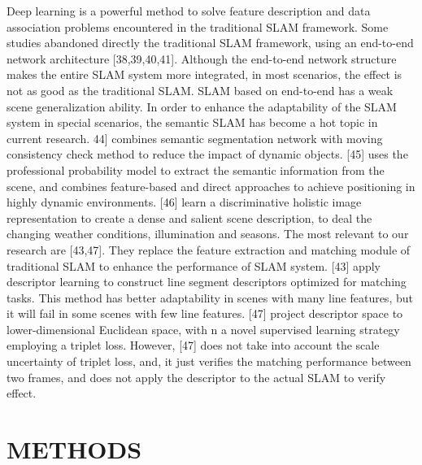 \documentclass[letterpaper, 10 pt, conference]{ieeeconf}  %
\begin{document}
Deep learning is a powerful method to solve feature description and data association problems encountered in the traditional SLAM framework. Some studies abandoned directly the traditional SLAM framework, using an end-to-end network architecture [38,39,40,41]. Although the end-to-end network structure makes the entire SLAM system more integrated, in most scenarios, the effect is not as good as the traditional SLAM. SLAM based on end-to-end has a weak scene generalization ability. In order to enhance the adaptability of the SLAM system in special scenarios, the semantic SLAM has become a hot topic in current research. 44] combines semantic segmentation network with moving consistency check method to reduce the impact of dynamic objects. [45] uses the professional probability model to extract the semantic information from the scene, and combines feature-based and direct approaches to achieve positioning in highly dynamic environments. [46] learn a discriminative holistic image representation to create a dense and salient scene description, to deal the changing weather conditions, illumination and seasons.
The most relevant to our research are [43,47]. They replace the feature extraction and matching module of traditional SLAM to enhance the performance of SLAM system. [43] apply descriptor learning to construct line segment descriptors optimized for matching tasks. This method has better adaptability in scenes with many line features, but it will fail in some scenes with few line features. [47] project descriptor space to lower-dimensional Euclidean space, with n a novel supervised learning strategy employing a triplet loss. However, [47] does not take into account the scale uncertainty of triplet loss, and, it just verifies the matching performance between two frames, and does not apply the descriptor to the actual SLAM to verify effect.


\section{METHODS}
\end{document}
